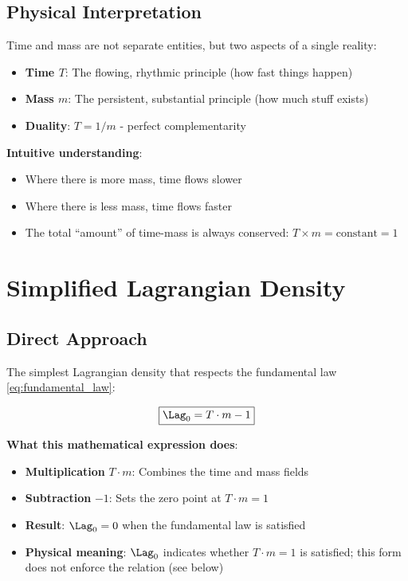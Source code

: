 	\subsection{Physical Interpretation}
	
	\begin{definition}
		Time and mass are not separate entities, but two aspects of a single reality:
		\begin{itemize}
			\item \textbf{Time $T$}: The flowing, rhythmic principle (how fast things happen)
			\item \textbf{Mass $m$}: The persistent, substantial principle (how much stuff exists)
			\item \textbf{Duality}: $T = 1/m$ - perfect complementarity
		\end{itemize}
	\end{definition}
	
	\textbf{Intuitive understanding}: 
	\begin{itemize}
		\item Where there is more mass, time flows slower
		\item Where there is less mass, time flows faster  
		\item The total ``amount'' of time-mass is always conserved: $T \times m = \text{constant} = 1$
	\end{itemize}
	
	\section{Simplified Lagrangian Density}
	
	\subsection{Direct Approach}
	
	The simplest Lagrangian density that respects the fundamental law \eqref{eq:fundamental_law}:
	
	\begin{equation}
		\boxed{\Lag_0 = T \cdot m - 1}
		\label{eq:simple_lagrangian}
	\end{equation}
	
	\textbf{What this mathematical expression does}:
	\begin{itemize}
		\item \textbf{Multiplication} $T \cdot m$: Combines the time and mass fields
		\item \textbf{Subtraction} $-1$: Sets the zero point at $T \cdot m = 1$
		\item \textbf{Result}: $\Lag_0 = 0$ when the fundamental law is satisfied
		\item \textbf{Physical meaning}: $\Lag_0$ indicates whether $T \cdot m = 1$ is satisfied; this form does not enforce the relation (see below)
	\end{itemize}
	

